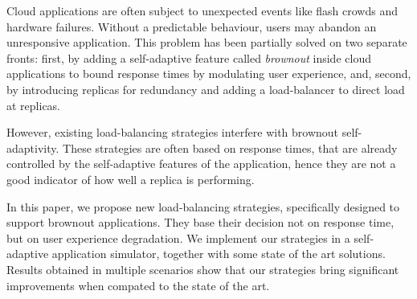 Cloud applications are often subject to unexpected events like flash
crowds and hardware failures. Without a predictable behaviour, users
may abandon an unresponsive application.  This problem has been
partially solved on two separate fronts: first, by adding a
self-adaptive feature called \emph{brownout} inside cloud applications
to bound response times by modulating user experience, and, second, by
introducing replicas for redundancy and adding a load-balancer to
direct load at replicas.

However, existing load-balancing strategies interfere with brownout
self-adaptivity.  These strategies are often based on response times,
that are already controlled by the self-adaptive features of the
application, hence they are not a good indicator of how well a replica
is performing.

In this paper, we propose new load-balancing strategies, specifically
designed to support brownout applications. They base their decision
not on response time, but on user experience degradation.  We
implement our strategies in a self-adaptive application simulator,
together with some state of the art solutions. Results obtained in
multiple scenarios show that our strategies bring significant
improvements when compated to the state of the art.
